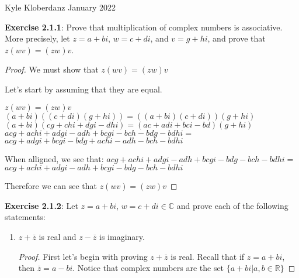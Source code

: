 \documentclass[a4paper]{article}
\begin{document}
\begin{myparindent}{0pt}

Kyle Kloberdanz  January 2022 \newline

\textbf{Exercise 2.1.1}:
Prove that multiplication of complex numbers is associative. More precisely,
let $z = a + bi$, $w = c + di$, and $v = g + hi$, and prove that
$z(wv) = (zw)v$.

\begin{proof}
    We must show that $z(wv) = (zw)v$ \newline

    Let's start by assuming that they are equal.

    $z(wv) = (zw)v$ \newline
    \newline
    $(a + bi)((c + di)(g + hi)) = ((a + bi)(c + di))(g + hi)$ \newline
    \newline
    $(a + bi)(cg+ chi + dgi - dhi) = (ac + adi + bci - bd)(g + hi) $ \newline
    \newline
    $acg + achi + adgi - adh + bcgi - bch - bdg - bdhi = $ \newline
    $acg + adgi + bcgi - bdg + achi - adh - bch - bdhi$ \newline

    When alligned, we see that: \newline
    $acg + achi + adgi - adh + bcgi - bdg - bch - bdhi = $ \newline
    $acg + achi + adgi - adh + bcgi - bdg - bch - bdhi$ \newline

    Therefore we can see that $z(wv) = (zw)v$ \newline
\end{proof}

\textbf{Exercise 2.1.2}:
Let $z = a + bi$, $w = c + di \in \mathbb{C}$ and prove each of the following
statements:

\begin{enumerate}[label=(\roman*)]
  \item $z + \overline{z}$ is real and $z - \overline{z}$ is imaginary.
    \begin{proof}
        First let's begin with proving $z + \overline{z}$ is real. \newline
        Recall that if $z = a + bi$, then $\overline{z} = a - bi$. \newline
        Notice that complex numbers are the set $\{ a + bi | a, b \in \mathbb{R} \}$


\end{proof}
\end{enumerate}
\end{myparindent}
\end{document}
